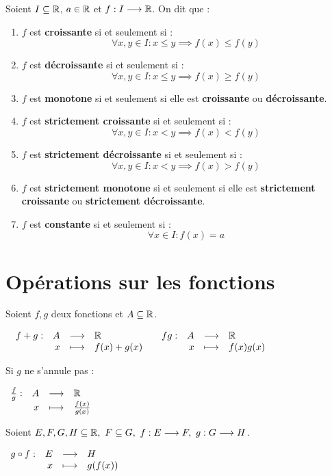 \begin{definition}
	Soient $I \subseteq \mathbb{R}$, $a \in \mathbb{R}$ et $f : I \longrightarrow \mathbb{R}$. On dit que :
    \begin{enumerate}
        \item $f$ est \textbf{croissante} si et seulement si :
        \[ \forall x, y \in I : x \leq y \implies f(x) \leq f(y) \]
        \item $f$ est \textbf{décroissante} si et seulement si : 
        \[ \forall x, y \in I : x \leq y \implies f(x) \geq f(y) \]
        \item $f$ est \textbf{monotone} si et seulement si elle est \textbf{croissante} ou \textbf{décroissante}.
        \item $f$ est \textbf{strictement croissante} si et seulement si : 
        \[ \forall x, y \in I : x < y \implies f(x) < f(y) \]
        \item $f$ est \textbf{strictement décroissante} si et seulement si :
        \[ \forall x, y \in I : x < y \implies f(x) > f(y) \]
        \item $f$ est \textbf{strictement monotone} si et seulement si elle est \textbf{strictement croissante} ou \textbf{strictement décroissante}.
        \item $f$ est \textbf{constante} si et seulement si :
        \[ \forall x \in I : f(x) = a \]
    \end{enumerate}
\end{definition}

\section{Opérations sur les fonctions}
\begin{definition}
	Soient $f, g$ deux fonctions et $A \subseteq \mathbb{R}$.
	\begin{center}
		$
		\begin{array}{cc}
			\begin{array}{rrcl} f+g : & A & \longrightarrow & \mathbb{R} \\ & x & \longmapsto & f(x)+g(x) \end{array}
			&
			\begin{array}{rrcl} fg : & A & \longrightarrow & \mathbb{R} \\ & x & \longmapsto & f(x)g(x) \end{array}
		\end{array}
		$
	\end{center}
	Si $g$ ne s'annule pas :
	\begin{center}
		$
		\begin{array}{rrcl} \frac{f}{g} : & A & \longrightarrow & \mathbb{R} \\ & x & \longmapsto & \frac{f(x)}{g(x)} \end{array}
		$
	\end{center}
\end{definition}

\begin{definition}
	Soient $E, F, G, H \subseteq \mathbb{R},\ F \subseteq G,\ f : E \longrightarrow F,\ g : G \longrightarrow H$.
	\begin{center}
		$
		\begin{array}{rrcl} g \circ f : & E & \longrightarrow & H \\ & x & \longmapsto & g(f(x)) \end{array}
		$
	\end{center}
\end{definition}

